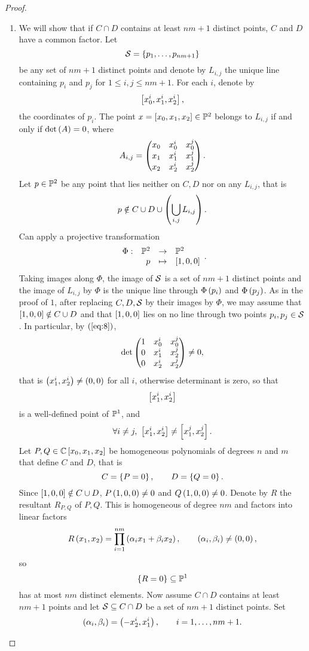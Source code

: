 \begin{proof}
\begin{enumerate}

\item We will show that if $ C \cap D $ contains at least $ nm + 1 $ distinct points, $ C $ and $ D $ have a common factor. Let
$$ \SS = \cb{p_1, \dots, p_{nm + 1}} $$
be any set of $ nm + 1 $ distinct points and denote by $ L_{i, j} $ the unique line containing $ p_i $ and $ p_j $ for $ 1 \le i, j \le nm + 1 $. For each $ i $, denote by
$$ \sb{x_0^i, x_1^i, x_2^i}, $$
the coordinates of $ p_i $. The point $ x = \sb{x_0, x_1, x_2} \in \P^2 $ belongs to $ L_{i, j} $ if and only if $ \det\rb{A} = 0 $, where
\begin{equation}
\label{eq:8}
A_{i, j} = \threebythree{x_0}{x_0^i}{x_0^j}{x_1}{x_1^i}{x_1^j}{x_2}{x_2^i}{x_2^j}.
\end{equation}
Let $ p \in \P^2 $ be any point that lies neither on $ C, D $ nor on any $ L_{i, j} $, that is
$$ p \notin C \cup D \cup \rb{\bigcup_{i, j} L_{i, j}}. $$
Can apply a projective transformation
$$ \function[\Phi]{\P^2}{\P^2}{p}{\sb{1, 0, 0}}. $$
Taking images along $ \Phi $, the image of $ \SS $ is a set of $ nm + 1 $ distinct points and the image of $ L_{i, j} $ by $ \Phi $ is the unique line through $ \Phi\rb{p_i} $ and $ \Phi\rb{p_j} $. As in the proof of $ 1 $, after replacing $ C, D, \SS $ by their images by $ \Phi $, we may assume that $ \sb{1, 0, 0} \notin C \cup D $ and that $ \sb{1, 0, 0} $ lies on no line through two points $ p_i, p_j \in \SS $. In particular, by $ \rb{\ref{eq:8}} $,
$$ \det\threebythree{1}{x_0^i}{x_0^j}{0}{x_1^i}{x_2^j}{0}{x_2^i}{x_2^j} \ne 0, $$
that is $ \rb{x_1^i, x_2^i} \ne \rb{0, 0} $ for all $ i $, otherwise determinant is zero, so that
$$ \sb{x_1^i, x_2^i} $$
is a well-defined point of $ \P^1 $, and
$$ \forall i \ne j, \ \sb{x_1^i, x_2^i} \ne \sb{x_1^j, x_2^j}. $$
Let $ P, Q \in \C\sb{x_0, x_1, x_2} $ be homogeneous polynomials of degrees $ n $ and $ m $ that define $ C $ and $ D $, that is
$$ C = \cb{P = 0}, \qquad D = \cb{Q = 0}. $$
Since $ \sb{1, 0, 0} \notin C \cup D $, $ P\rb{1, 0, 0} \ne 0 $ and $ Q\rb{1, 0 , 0} \ne 0 $. Denote by $ R $ the resultant $ R_{P, Q} $ of $ P, Q $. This is homogeneous of degree $ nm $ and factors into linear factors
$$ R\rb{x_1, x_2} = \prod_{i = 1}^{nm}\rb{\alpha_ix_1 + \beta_ix_2}, \qquad \rb{\alpha_i, \beta_i} \ne \rb{0, 0}, $$
so
$$ \cb{R = 0} \subseteq \P^1 $$
has at most $ nm $ distinct elements. Now assume $ C \cap D $ contains at least $ nm + 1 $ points and let $ \SS \subseteq C \cap D $ be a set of $ nm + 1 $ distinct points. Set
$$ \rb{\alpha_i, \beta_i} = \rb{-x_2^i, x_1^i}, \qquad i = 1, \dots, nm + 1. $$

\end{enumerate}
\end{proof}
